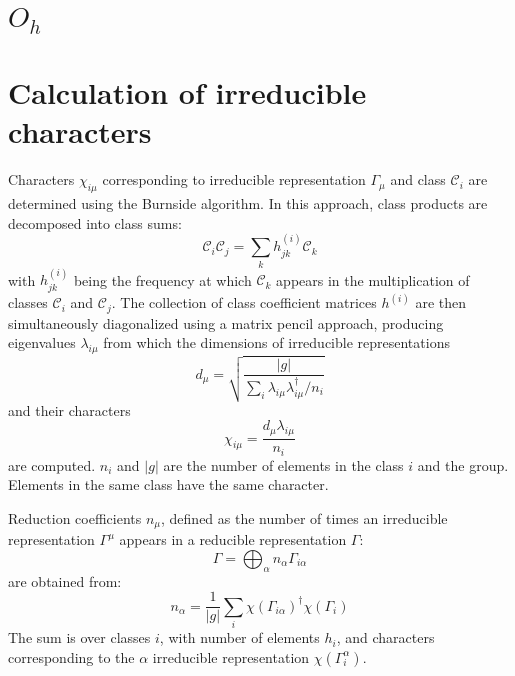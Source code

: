 \documentclass[twocolumn,showpacs,preprintnumbers,superscriptaddress,prb,floatfix,aps,10pt]{revtex4-1}
\newcommand*{\class}{\mathcal{C}}
\begin{document}

\section{$O_h$}
\label{appendix:pg}
\section{Calculation of irreducible characters}
\label{appendix:chartab}
Characters $\chi_{i\mu}$ corresponding to irreducible representation $\Gamma_\mu$ and class $\class_i$ are determined using the Burnside algorithm.\cite{burnside_theory_2010,mckay_construction_1970,unger_computing_2006,schneider_dixons_1990,dixon_high_1967} In this approach, class products are decomposed into class sums:
\begin{equation}
\label{eq:class_coefficients}
\class_i \class_j = \sum_k h_{jk}^{(i)} \class_k
\end{equation}
with $h_{jk}^{(i)}$ being the frequency at which $\class_k$ appears in the multiplication of classes $\class_i$ and $\class_j$. The collection of class coefficient matrices $h^{(i)}$ are then simultaneously diagonalized using a matrix pencil approach, producing eigenvalues $\lambda_{i\mu}$ from which the dimensions of irreducible representations
\begin{equation}
\label{eq:irrep_dimension}
d_\mu = \sqrt{ \frac{|g|}{\sum_i \lambda_{i\mu} \lambda^{\dag}_{i\mu} / n_i }  }
\end{equation}
and their characters
\begin{equation}
\label{eq:irrep_characters}
\chi_{i\mu} = \frac{d_\mu \lambda_{i\mu}}{n_i}
\end{equation}
are computed. $n_i$ and $|g|$ are the number of elements in the class $i$ and the group. Elements in the same class have the same character.

Reduction coefficients $n_\mu$, defined as the number of times an irreducible representation $\Gamma^\mu$ appears in a reducible representation $\Gamma$:
\begin{equation}
\label{eq:irrep_decomposition}
\Gamma = \bigoplus_\alpha n_\alpha \Gamma_{i\alpha}
\end{equation}
are obtained from:
\begin{equation}
\label{eq:irrep_decomposition_coefficients}
n_\alpha = \frac{1}{|g|} \sum_i \chi\left(\Gamma_{i\alpha}\right)^\dag \chi\left(\Gamma_i\right)
\end{equation}
The sum is over classes $i$, with number of elements $h_i$, and characters corresponding to the $\alpha$ irreducible representation $\chi(\Gamma_i^\alpha)$.





%
%
%
\end{document}

